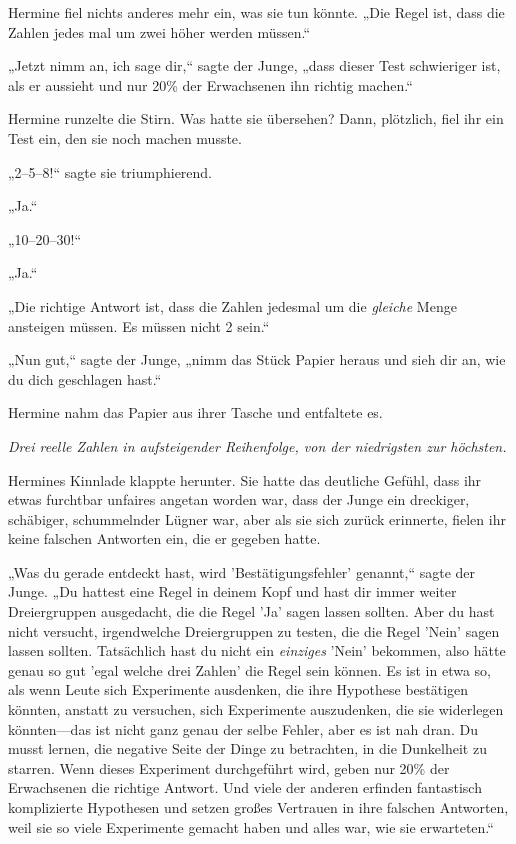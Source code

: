{Hermine fiel nichts anderes mehr ein, was sie tun könnte. „Die Regel ist, dass die Zahlen jedes mal um zwei höher werden müssen.“

„Jetzt nimm an, ich sage dir,“ sagte der Junge, „dass dieser Test schwieriger ist, als er aussieht und nur 20\% der Erwachsenen ihn richtig machen.“

Hermine runzelte die Stirn. Was hatte sie übersehen? Dann, plötzlich, fiel ihr ein Test ein, den sie noch machen musste.

„2–5–8!“ sagte sie triumphierend.

„Ja.“

„10–20–30!“

„Ja.“

„Die richtige Antwort ist, dass die Zahlen jedesmal um die \emph{gleiche} Menge ansteigen müssen. Es müssen nicht 2 sein.“

„Nun gut,“ sagte der Junge, „nimm das Stück Papier heraus und sieh dir an, wie du dich geschlagen hast.“

Hermine nahm das Papier aus ihrer Tasche und entfaltete es.

\emph{Drei reelle Zahlen in aufsteigender Reihenfolge, von der niedrigsten zur höchsten.}

Hermines Kinnlade klappte herunter. Sie hatte das deutliche Gefühl, dass ihr etwas furchtbar unfaires angetan worden war, dass der Junge ein dreckiger, schäbiger, schummelnder Lügner war, aber als sie sich zurück erinnerte, fielen ihr keine falschen Antworten ein, die er gegeben hatte.

„Was du gerade entdeckt hast, wird 'Bestätigungsfehler' genannt,“ sagte der Junge. „Du hattest eine Regel in deinem Kopf und hast dir immer weiter Dreiergruppen ausgedacht, die die Regel 'Ja' sagen lassen sollten. Aber du hast nicht versucht, irgendwelche Dreiergruppen zu testen, die die Regel 'Nein' sagen lassen sollten. Tatsächlich hast du nicht ein \emph{einziges} 'Nein' bekommen, also hätte genau so gut 'egal welche drei Zahlen' die Regel sein können. Es ist in etwa so, als wenn Leute sich Experimente ausdenken, die ihre Hypothese bestätigen könnten, anstatt zu versuchen, sich Experimente auszudenken, die sie widerlegen könnten—das ist nicht ganz genau der selbe Fehler, aber es ist nah dran. Du musst lernen, die negative Seite der Dinge zu betrachten, in die Dunkelheit zu starren. Wenn dieses Experiment durchgeführt wird, geben nur 20\% der Erwachsenen die richtige Antwort. Und viele der anderen erfinden fantastisch komplizierte Hypothesen und setzen großes Vertrauen in ihre falschen Antworten, weil sie so viele Experimente gemacht haben und alles war, wie sie erwarteten.“

}
